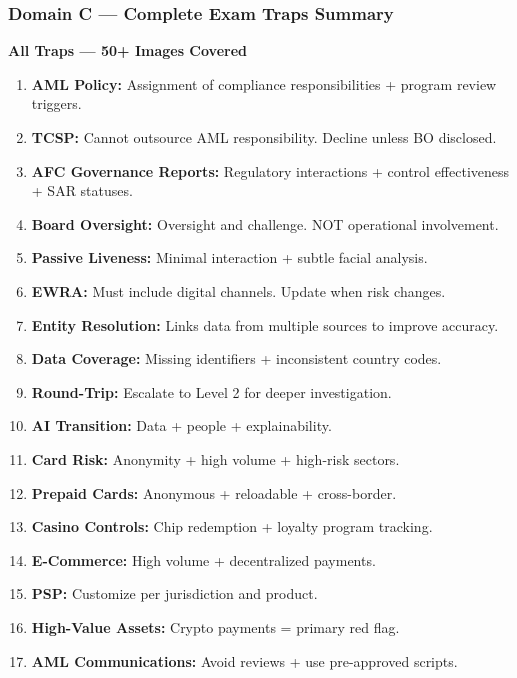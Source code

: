 \documentclass[12pt,aspectratio=169]{beamer}
\renewcommand{\scriptsize}{\fontsize{4.5}{5.5}\selectfont}
\begin{document}
	\begin{frame}
		\frametitle{\fontsize{11}{13}\selectfont \textbf{Domain C — Complete Exam Traps Summary}}
		\scriptsize
		\begin{block}{\fontsize{7}{9}\selectfont \textbf{All Traps — 50+ Images Covered}}
			\scriptsize
			\begin{enumerate}
				\item \textbf{AML Policy:} Assignment of compliance responsibilities + program review triggers.
				\item \textbf{TCSP:} Cannot outsource AML responsibility. Decline unless BO disclosed.
				\item \textbf{AFC Governance Reports:} Regulatory interactions + control effectiveness + SAR statuses.
				\item \textbf{Board Oversight:} Oversight and challenge. NOT operational involvement.
				\item \textbf{Passive Liveness:} Minimal interaction + subtle facial analysis.
				\item \textbf{EWRA:} Must include digital channels. Update when risk changes.
				\item \textbf{Entity Resolution:} Links data from multiple sources to improve accuracy.
				\item \textbf{Data Coverage:} Missing identifiers + inconsistent country codes.
				\item \textbf{Round-Trip:} Escalate to Level 2 for deeper investigation.
				\item \textbf{AI Transition:} Data + people + explainability.
				\item \textbf{Card Risk:} Anonymity + high volume + high-risk sectors.
				\item \textbf{Prepaid Cards:} Anonymous + reloadable + cross-border.
				\item \textbf{Casino Controls:} Chip redemption + loyalty program tracking.
				\item \textbf{E-Commerce:} High volume + decentralized payments.
				\item \textbf{PSP:} Customize per jurisdiction and product.
				\item \textbf{High-Value Assets:} Crypto payments = primary red flag.
				\item \textbf{AML Communications:} Avoid reviews + use pre-approved scripts.

\end{enumerate}
\end{block}
\end{frame}
\end{document}
